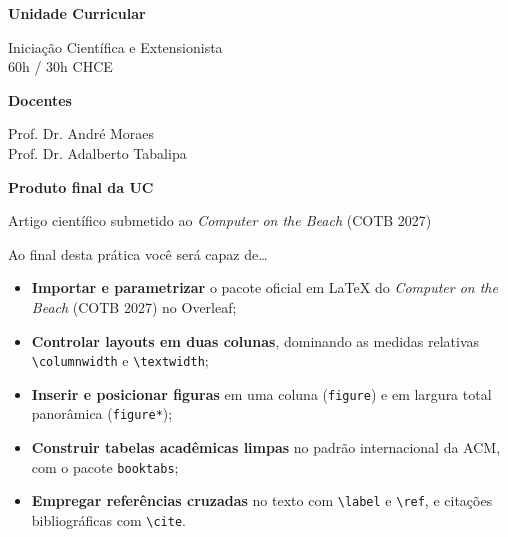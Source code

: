     \begin{tcbraster}[raster columns=3, raster equal height, raster column skip=8pt]
        \begin{tcolorbox}[cartao]
            {\color{azulMedio}\faUniversity}\hspace{0.4em}\textbf{Unidade Curricular}\par\vspace{2pt}
            Iniciação Científica e Extensionista\\ {\color{suave}60h / 30h CHCE}
        \end{tcolorbox}
        \begin{tcolorbox}[cartao]
            {\color{azulMedio}\faChalkboardTeacher}\hspace{0.4em}\textbf{Docentes}\par\vspace{2pt}
            Prof. Dr. André Moraes\\ Prof. Dr. Adalberto Tabalipa
        \end{tcolorbox}
        \begin{tcolorbox}[cartao]
            {\color{azulMedio}\faFlag}\hspace{0.4em}\textbf{Produto final da UC}\par\vspace{2pt}
            Artigo científico submetido ao \textit{Computer on the Beach} (COTB 2027)
        \end{tcolorbox}
    \end{tcbraster}

    \vspace{0.6em}

    \begin{painel}{\faBullseye}{Ao final desta prática você será capaz de\ldots}
        \begin{itemize}
            \item \textbf{Importar e parametrizar} o pacote oficial em \LaTeX{} do \textit{Computer on the Beach} (COTB 2027) no Overleaf;
            \item \textbf{Controlar layouts em duas colunas}, dominando as medidas relativas \texttt{\textbackslash columnwidth} e \texttt{\textbackslash textwidth};
            \item \textbf{Inserir e posicionar figuras} em uma coluna (\texttt{figure}) e em largura total panorâmica (\texttt{figure*});
            \item \textbf{Construir tabelas acadêmicas limpas} no padrão internacional da ACM, com o pacote \texttt{booktabs};
            \item \textbf{Empregar referências cruzadas} no texto com \texttt{\textbackslash label} e \texttt{\textbackslash ref}, e citações bibliográficas com \texttt{\textbackslash cite}.
        \end{itemize}
    \end{painel}

